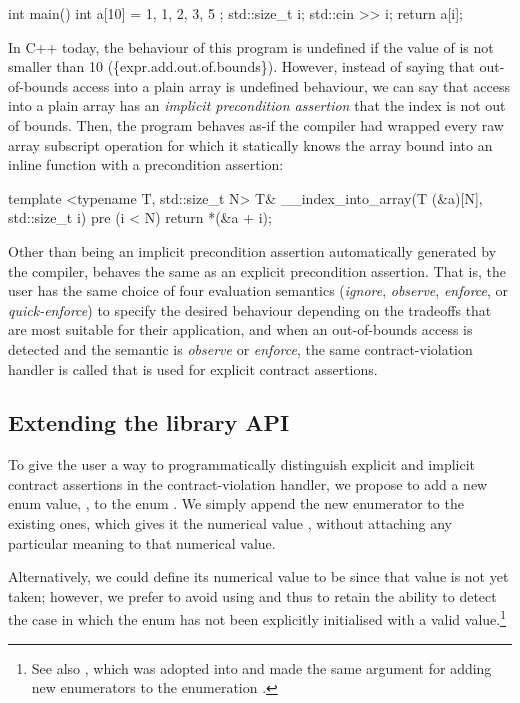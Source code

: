 {\begin{codeblock}
int main() {
  int a[10] = { 1, 1, 2, 3, 5 };
  std::size_t i; 
  std::cin >> i;
  return a[i];
}
\end{codeblock}

In C++ today, the behaviour of this program is undefined if the value of  is not smaller than 10 (\{expr.add.out.of.bounds\}). However, instead of saying that out-of-bounds access into a plain array is undefined behaviour, we can say that access into a plain array has an \emph{implicit precondition assertion} that the index is not out of bounds. Then, the program behaves as-if the compiler had wrapped every raw array subscript operation for which it statically knows the array bound  into an inline function with a precondition assertion:

\begin{codeblock}
template <typename T, std::size_t N>
T& __index_into_array(T (&a)[N], std::size_t i) 
pre (i < N) {
  return *(&a + i);
}
\end{codeblock}

Other than being an implicit precondition assertion automatically generated by the compiler,  behaves the same as an explicit precondition assertion. That is, the user has the same choice of four evaluation semantics (\emph{ignore}, \emph{observe}, \emph{enforce}, or \emph{quick-enforce}) to specify the desired behaviour depending on the tradeoffs that are most suitable for their application, and when an out-of-bounds access is detected and the semantic is \emph{observe} or \emph{enforce}, the same contract-violation handler is called that is used for explicit contract assertions.

\subsection{Extending the library API}
\label{library}

To give the user a way to programmatically distinguish explicit and implicit contract assertions in the contract-violation handler, we propose to add a new enum value, , to the enum \mbox{}. We simply append the new enumerator to the existing ones, which gives it the numerical value , without attaching any particular meaning to that numerical value.

Alternatively, we could define its numerical value to be  since that value is not yet taken; however, we prefer to avoid using  and thus to retain the ability to detect the case in which the enum has not been explicitly initialised with a valid value.\footnote{See also \cite{P3227R0}, which was adopted into \cite{P2900R14} and made the same argument for adding new enumerators to the enumeration .}

}
